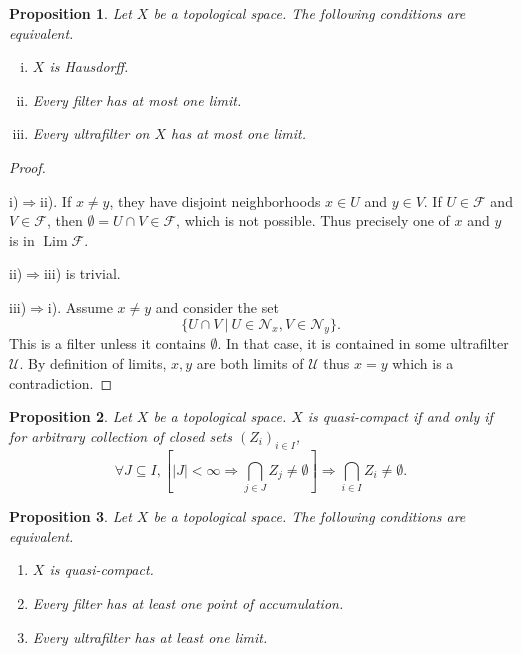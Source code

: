 \documentclass[8pt]{article}
\numberwithin{equation}{section}
\newtheorem{proposition}{Proposition}[subsection]
\DeclareMathOperator{\Lim}{Lim}
\newcommand{\F}[0]{\mathcal{F}}
\newcommand{\U}[0]{\mathcal{U}}
\newcommand{\sep}[0]{\:|\:}
\newcommand{\Nfil}[0]{\mathcal{N}}
\begin{document}
\begin{proposition}
    \label{proposition_2}
    Let $X$ be a topological space. The following conditions are equivalent.
    \begin{enumerate}[i.]
        \item $X$ is Hausdorff.
        \item Every filter has at most one limit.
        \item Every ultrafilter on $X$ has at most one limit.
    \end{enumerate}
\end{proposition}
\begin{proof}$\:$
    \par i)$\Rightarrow$ii). If $x\not=y$, they have disjoint neighborhoods $x\in U$ and $y\in V$. If $U\in\F$ and $V\in\F$, then $\emptyset=U\cap V\in\F$, which is not possible. Thus precisely one of $x$ and $y$ is in $\Lim\F$. 
    \par ii)$\Rightarrow$iii) is trivial.
    \par iii)$\Rightarrow$i). Assume $x\not=y$ and consider the set 
    \begin{equation*}
    \{U\cap V\sep U\in\Nfil_x,V\in\Nfil_y\}.
    \end{equation*}
    This is a filter unless it contains $\emptyset$. In that case, it is contained in some ultrafilter $\U$. By definition of limits, $x,y$ are both limits of $\U$ thus $x=y$ which is a contradiction.
\end{proof}
\begin{proposition}
    Let $X$ be a topological space. $X$ is quasi-compact if and only if for arbitrary collection of closed sets $(Z_i)_{i\in I}$,
    \begin{equation*}
        \forall J\subseteq I, \left[\vert J\vert<\infty\Rightarrow \bigcap_{j\in J}Z_j\not=\emptyset\right]\Rightarrow \bigcap_{i\in I}Z_i\not=\emptyset.
    \end{equation*}
\end{proposition}
\begin{proposition}
    \label{proposition_2_another}
    Let $X$ be a topological space. The following conditions are equivalent.
    \begin{enumerate}[i'.]
        \item $X$ is quasi-compact.
        \item Every filter has at least one point of accumulation.
        \item Every ultrafilter has at least one limit.
    \end{enumerate}
\end{proposition}
\end{document}
